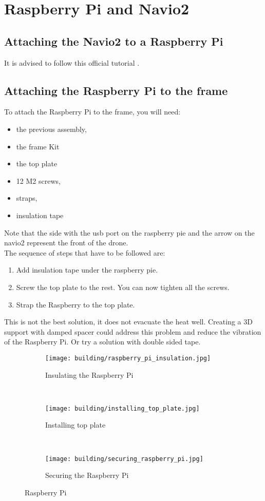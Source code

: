 \section{Raspberry Pi and Navio2}
\subsection{Attaching the Navio2 to a Raspberry Pi}
It is advised to follow this official tutorial \cite{emlid_hardware_setup}.

\subsection{Attaching the Raspberry Pi to the frame}
To attach the Raspberry Pi to the frame, you will need:
\begin{itemize}
    \item the previous assembly,
    \item the frame Kit
    \item the top plate
    \item 12 M2 screws,
    \item straps,
    \item insulation tape
\end{itemize}
Note that the side with the usb port on the raspberry pie and the arrow on the navio2 represent the front of the drone.\\
The sequence of steps that have to be followed are:
\begin{enumerate}
    \item Add insulation tape under the raspberry pie.
    \item Screw the top plate to the rest. You can now tighten all the screws.
    \item Strap the Raspberry to the top plate.
\end{enumerate}

This is not the best solution, it does not evacuate the heat well. Creating a 3D support with damped spacer could address this problem and reduce the vibration of the Raspberry Pi. Or try a solution with double sided tape.

\begin{figure}[!ht]
    \centering
    \begin{subfigure}[b]{0.3\textwidth}
        \texttt{[image: building/raspberry\_pi\_insulation.jpg]}
        \caption{Insulating the Raspberry Pi}
        \label{fig:rpi_insulation}
    \end{subfigure}
    ~
    \begin{subfigure}[b]{0.3\textwidth}
        \texttt{[image: building/installing\_top\_plate.jpg]}
        \caption{Installing top plate}
        \label{fig:install_top_plate}
    \end{subfigure}
    ~
    \begin{subfigure}[b]{0.3\textwidth}
        \texttt{[image: building/securing\_raspberry\_pi.jpg]}
        \caption{Securing the Raspberry Pi}
        \label{fig:rpi_secure}
    \end{subfigure}
    \caption{Raspberry Pi}\label{fig:rpi}
\end{figure}

